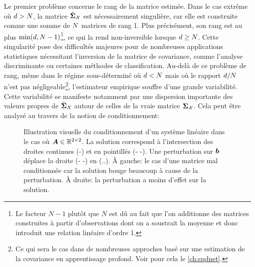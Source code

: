 Le premier problème concerne le rang de la matrice estimée. Dans le cas extrême où $d > N$, la matrice $\hat{\boldsymbol{\Sigma}}_{\mathcal{X}}$ est nécessairement singulière, car elle est construite comme une somme de $N$ matrices de rang 1. Plus précisément, son rang est au plus $\min(d, N-1)$\footnote{Le facteur $N-1$ plutôt que $N$ est dû au fait que l'on additionne des matrices construites à partir d'observations dont on a soustrait la moyenne et donc introduit une relation linéaire d'ordre 1.}, ce qui la rend non-inversible lorsque $d \geq N$. Cette singularité pose des difficultés majeures pour de nombreuses applications statistiques nécessitant l'inversion de la matrice de covariance, comme l'analyse discriminante ou certaines méthodes de classification. Au-delà de ce problème de rang, même dans le régime sous-déterminé où $d < N$ mais où le rapport $d/N$ n'est pas négligeable\footnote{Ce qui sera le cas dans de nombreuses approches basé sur une estimation de la covariance en apprentissage profond. Voir pour cela le \cref{ch:spdnet}.}, l'estimateur empirique souffre d'une grande variabilité. Cette variabilité se manifeste notamment par une dispersion importante des valeurs propres de $\hat{\boldsymbol{\Sigma}}_{\mathcal{X}}$ autour de celles de la vraie matrice $\boldsymbol{\Sigma}_{\mathcal{X}}$. Cela peut être analysé au travers de la notion de conditionnement:

\begin{figure}
  \begin{center}
      \begin{minipage}{0.45\textwidth}
        
      \end{minipage}
      \begin{minipage}{0.45\textwidth}
        
      \end{minipage}
      \vspace{-2em}
      \end{center}
  \caption{Illustration visuelle du conditionnement d'un système linéaire dans le cas où $\boldsymbol{A}\in\mathbb{R}^{2\times 2}$. La solution correspond à l'intersection des droites continues (-) et en pointillés (- -). Une perturbation sur $\boldsymbol{b}$ déplace la droite (- -) en (..). À gauche: le cas d'une matrice mal conditionnée car la solution bouge beaucoup à cause de la perturbation. À droite: la perturbation a moins d'effet sur la solution.}\label{fig:context-estimation-condition}
\end{figure}

